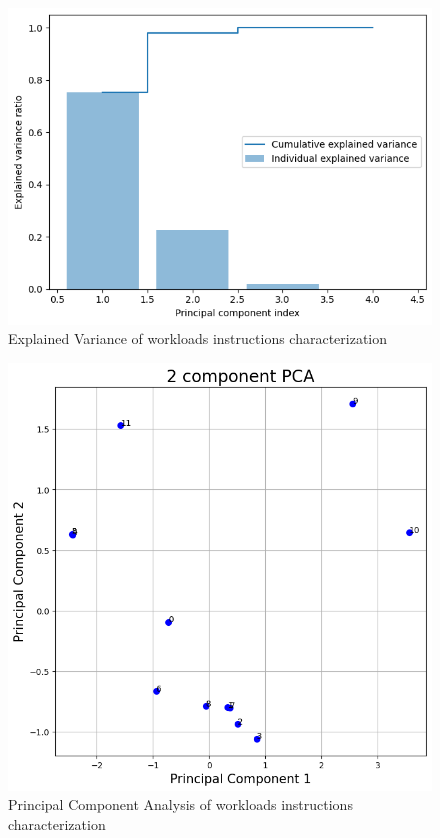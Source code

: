 \documentclass[]{PhDEngScITESO-R}
\begin{document}
\begin{figure}[h]
    \centering
    \includegraphics[width=\textwidth] {Reporte IDI-2 ITESO/img/variance_spec.png}
    \caption{Explained Variance  of workloads instructions characterization}
    \label{fig:explained_var}
\end{figure}

\begin{figure}[h]
    \centering
    \includegraphics[width=\textwidth] {Reporte IDI-2 ITESO/img/pca_spec.png}
    \caption{Principal Component Analysis of workloads instructions characterization }
    \label{fig:pca_full}
\end{figure}
\end{document}

